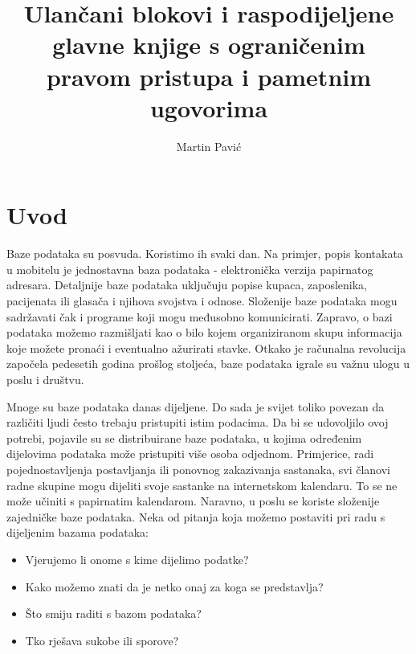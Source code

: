 \documentclass[times, utf8, diplomski]{fer}
\begin{document}

\title{Ulančani blokovi i raspodijeljene glavne knjige s ograničenim pravom pristupa i pametnim ugovorima}

\author{Martin Pavić}

\maketitle



\zahvala{}

\tableofcontents
\listoffigures
\listoftables

\chapter{Uvod}
Baze podataka su posvuda.  Koristimo ih svaki dan. Na primjer, popis kontakata u mobitelu je jednostavna baza podataka - elektronička verzija papirnatog adresara. Detaljnije baze podataka uključuju popise kupaca, zaposlenika, pacijenata ili glasača i njihova svojstva i odnose. Složenije baze podataka mogu sadržavati čak i programe koji mogu međusobno komunicirati. Zapravo, o bazi podataka možemo razmišljati kao o bilo kojem organiziranom skupu informacija koje možete pronaći i eventualno ažurirati stavke. Otkako je računalna revolucija započela pedesetih godina prošlog stoljeća, baze podataka igrale su važnu ulogu u poslu i društvu.

Mnoge su baze podataka danas dijeljene. Do sada je svijet toliko povezan da različiti ljudi često trebaju pristupiti istim podacima. Da bi se udovoljilo ovoj potrebi, pojavile su se distribuirane baze podataka, u kojima određenim dijelovima podataka može pristupiti više osoba odjednom. Primjerice, radi pojednostavljenja postavljanja ili ponovnog zakazivanja sastanaka, svi članovi radne skupine mogu dijeliti svoje sastanke na internetskom kalendaru. To se ne može učiniti s papirnatim kalendarom. Naravno, u poslu se koriste složenije zajedničke baze podataka. Neka od pitanja koja možemo postaviti pri radu s dijeljenim bazama podataka:

\begin{itemize}

\item Vjerujemo li onome s kime dijelimo podatke?

\item Kako možemo znati da je netko onaj za koga se predstavlja?

\item Što smiju raditi s bazom podataka?

\item Tko rješava sukobe ili sporove?

\end{itemize}
\end{document}
